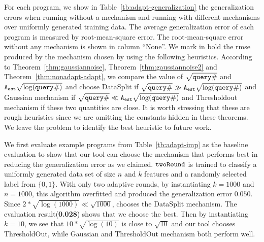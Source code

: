 For each program, we show in Table~\ref{tb:adapt-generalization} the
generalization errors when running without a mechanism and running
with different mechanisms over uniformly generated training data.  The
average generalization error of each program is measured by
root-mean-square error.  The root-mean-square error without any
mechanism is shown in column ``None''. 
We mark in bold the rmse
produced by the mechanism chosen by {\THESYSTEM} using the following
heuristics.  According to Theorem~\ref{thm:gaussiannoise},
Theorem~\ref{thm:gaussiannoise2} and Theorem~\ref{thm:nonadapt-adapt},
we compare the value of $\sqrt{{\tt query} \#}$ and
${\mathtt{A_{est}}}\sqrt{\log({\tt query} \#)}$ and choose DataSplit if
$\sqrt{{\tt query} \#} \gg {\ensuremath{\mathtt{A_{est}}}}\sqrt{\log({\tt query} \#)}$ and Gaussian
mechanism if $\sqrt{{\tt query} \#} \ll {\ensuremath{\mathtt{A_{est}}}}\sqrt{\log({\tt query} \#)}$ and
Thresholdout mechanism if these two quantities are close. 
 It is worth
stressing that these are rough heuristics since we are omitting the
constants hidden in these theorems. We leave the problem to identify
the best heuristic to future work.




We first evaluate example programs from Table~\ref{tb:adapt-imp} as the baseline evaluation to show that our tool can choose the mechanism that performs best in reducing the generalization error as we claimed.
$\mathtt{twoRound}$ is trained to classify a uniformly generated data set of size $n$ and $k$ features and a randomly selected label from $\{0, 1\}$. 
With only two adaptive rounds, by instantiating $k = 1000$ and $n = 1000$, this algorithm overfitted and produced the generalization error 
$0.050$.
Since $2* \sqrt{\log(1000)} \ll \sqrt{1000}$, {\THESYSTEM} chooses the DataSplit mechanism.
The evaluation result(\textbf{0.028}) shows that we choose the best.
Then by instantiating $k = 10$, we see that $10 * \sqrt{\log(10)}$ is close to $\sqrt{10}$ and our tool chooses ThresholdOut, while Gaussian and ThresholdOut mechanism both perform well.


